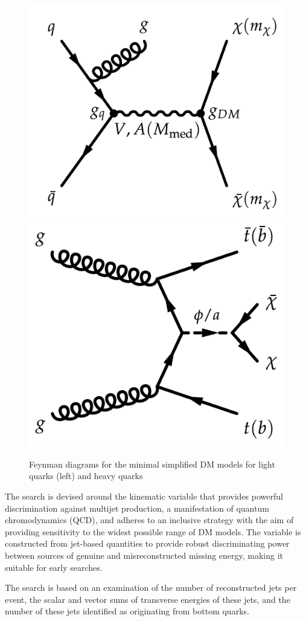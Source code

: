 \begin{figure}[thb]
\centering
\includegraphics[width=0.4\linewidth]{feynman_light_jet.pdf}
\hfill
\includegraphics[width=0.35\linewidth]{feynman_hf.pdf}
\caption{Feynman diagrams for the minimal simplified DM models for light quarks (left) and heavy quarks}
\label{fig:feyn}
\end{figure}

The search is devised around the kinematic variable \alphat that provides powerful discrimination against multijet production, a
manifestation of quantum chromodynamics (QCD), and adheres to an inclusive strategy with the aim of providing sensitivity to the widest possible range of DM models. The \alphat variable is constructed from jet-based quantities to provide robust discriminating power between sources of genuine and misreconstructed missing energy, making it suitable for early searches.

The search is based on an examination of the number of reconstructed jets per event, the scalar and vector sums of
transverse energies of these jets, and the number of these jets identified as originating from bottom quarks. 

